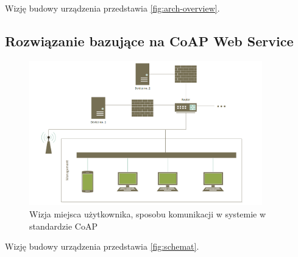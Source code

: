 Wizję budowy urządzenia przedstawia \autoref{fig:arch-overview}.

\subsection{Rozwiązanie bazujące na CoAP Web Service}

\begin{figure}[!htbp]
	\centering
	\includegraphics[width=0.9\textwidth]{images/schemat.png}
	\caption[Wizja architektury systemu w standardzie CoAP.]{Wizja miejsca użytkownika, sposobu komunikacji w systemie w standardzie CoAP}
	\label{fig:schemat}
\end{figure}
Wizję budowy urządzenia przedstawia \autoref{fig:schemat}.